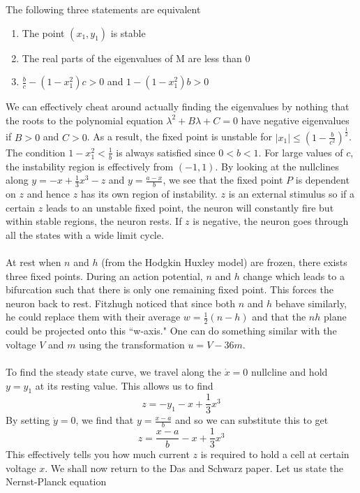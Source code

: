 \documentclass{article}
\numberwithin{equation}{section}
\begin{document}
The following three statements are equivalent 
\begin{enumerate}
    \item The point $(x_1,y_1)$ is stable
    \item The real parts of the eigenvalues of M are less than 0
    \item $\frac{b}{c}-(1-x_1^2)c>0$ and $1-(1-x_1^2)b>0$
\end{enumerate}
We can effectively cheat around actually finding the eigenvalues by nothing that the roots to the polynomial equation $\lambda^2+B\lambda +C=0$ have negative eigenvalues if $B>0$ and $C>0$. As a result, the fixed point is unstable for $|x_1| \leq (1-\frac{b}{c^2})^{\frac{1}{2}}$. The condition $1-x_1^2< \frac{1}{b}$ is always satisfied since $0<b<1$. For large values of $c$, the instability region is effectively from $(-1,1)$. By looking at the nullclines along $y=-x+\tfrac{1}{3}x^3-z$ and $y=\frac{a-x}{b}$, we see that the fixed point $P$ is dependent on $z$ and hence $z$ has its own region of instability. $z$ is an external stimulus so if a certain $z$ leads to an unstable fixed point, the neuron will constantly fire but within stable regions, the neuron rests. If $z$ is negative, the neuron goes through all the states with a wide limit cycle. \\\\
At rest when $n$ and $h$ (from the Hodgkin Huxley model) are frozen, there exists three fixed points. During an action potential, $n$ and $h$ change which leads to a bifurcation such that there is only one remaining fixed point. This forces the neuron back to rest. Fitzhugh noticed that since both $n$ and $h$ behave similarly, he could replace them with their average $w=\tfrac{1}{2}(n-h)$ and that the $nh$ plane could be projected onto this ``w-axis." One can do something similar with the voltage $V$ and $m$ using the transformation $u=V-36m$.\\\\
To find the steady state curve, we travel along the $\dot{x}=0$ nullcline and hold $y=y_1$ at its resting value. This allows us to find 
\begin{equation}
    z=-y_1-x+\frac{1}{3}x^3
\end{equation}
By setting $\dot{y}=0$, we find that $y = \frac{x-a}{b}$ and so we can substitute this to get 
\begin{equation}
    z= \frac{x-a}{b} -x+\frac{1}{3}x^3
\end{equation}
This effectively tells you how much current $z$ is required to hold a cell at certain voltage $x$. We shall now return to the Das and Schwarz paper. Let us state the Nernst-Planck equation
\end{document}
